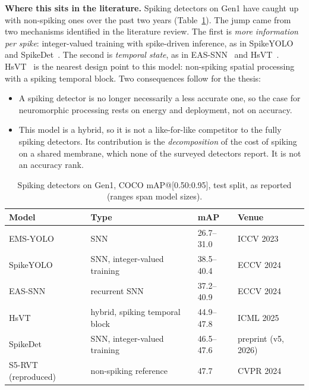 \documentclass[10pt,a4paper]{article}
\begin{document}
\textbf{Where this sits in the literature.} Spiking detectors on Gen1 have caught up with non-spiking ones
over the past two years (Table~\ref{tab:snn}). The jump came from two mechanisms identified in the
literature review. The first is \emph{more information per spike}: integer-valued training with spike-driven
inference, as in SpikeYOLO~\cite{luo2024integer} and SpikeDet~\cite{fan2025spikedet}. The second is
\emph{temporal state}, as in EAS-SNN~\cite{wang2024eas} and HsVT~\cite{xu2025hybrid}.
HsVT~\cite{xu2025hybrid} is the nearest design point to this model: non-spiking spatial processing with a
spiking temporal block. Two consequences follow for the thesis:
\begin{itemize}
  \item A spiking detector is no longer necessarily a less accurate one, so the case for neuromorphic
  processing rests on energy and deployment, not on accuracy.
  \item This model is a hybrid, so it is not a like-for-like competitor to the fully spiking detectors. Its
  contribution is the \emph{decomposition} of the cost of spiking on a shared membrane, which none of the
  surveyed detectors report. It is not an accuracy rank.
\end{itemize}

\begin{table}[htbp]
\centering\small
\caption{Spiking detectors on Gen1, COCO mAP@[0.50:0.95], test split, as reported (ranges span model sizes).}
\label{tab:snn}
\begin{tabular}{@{}llll@{}}
\toprule
\textbf{Model} & \textbf{Type} & \textbf{mAP} & \textbf{Venue} \\
\midrule
EMS-YOLO \cite{su2023deep} & SNN & 26.7--31.0 & ICCV 2023 \\
SpikeYOLO \cite{luo2024integer} & SNN, integer-valued training & 38.5--40.4 & ECCV 2024 \\
EAS-SNN \cite{wang2024eas} & recurrent SNN & 37.2--40.9 & ECCV 2024 \\
HsVT \cite{xu2025hybrid} & hybrid, spiking temporal block & 44.9--47.8 & ICML 2025 \\
SpikeDet \cite{fan2025spikedet} & SNN, integer-valued training & 46.5--47.6 & preprint (v5, 2026) \\
\midrule
S5-RVT \cite{zubic2024state} (reproduced) & non-spiking reference & 47.7 & CVPR 2024 \\
\bottomrule
\end{tabular}
\end{table}
\end{document}
